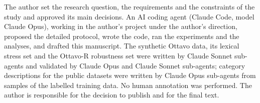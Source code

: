 The author set the research question, the requirements and the constraints of the study and approved its main decisions. An AI
coding agent (Claude Code, model Claude Opus), working in the author's project under the author's direction, proposed the detailed
protocol, wrote the code, ran the experiments and the analyses, and drafted this manuscript. The synthetic Ottavo data,
its lexical stress set and the Ottavo-R robustness set were written by Claude Sonnet sub-agents and validated by Claude Opus and
Claude Sonnet sub-agents; category descriptions for the public datasets were written by Claude Opus sub-agents from samples of the labelled training data. No human annotation
was performed. The author is responsible for the decision to publish and for the final text.
